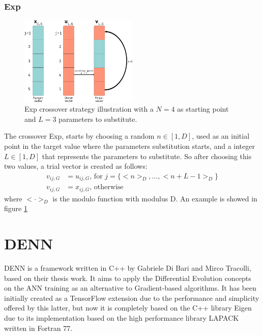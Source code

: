 \subsubsection{Exp}
\begin{figure}[h!]
	\centering
	\includegraphics[width=0.5\textwidth]{figures/de-exp.png}
	\caption{Exp crossover strategy illustration with a $N = 4$ as starting point and $L = 3$ parameters to substitute.}
	\label{fig:exp-crossover}
\end{figure}
The crossover Exp, starts by choosing a random $n \in [1, D]$, used as an initial point in the target value where the parameters substitution starts, and a integer $L \in [1, D]$ that represents the parameters to substitute. So after choosing this two values, a trial vector is created as follows:
\begin{align}
	v_{ij, G} &= u_{ij, G}\textrm{,  for } j = \{<n>_{D}, \dots, <n + L - 1>_{D}\} \\
	v_{ij, G} &= x_{ij, G}\textrm{,  otherwise}
\end{align} 
where $< \cdot >_{D}$ is the modulo function with modulus D. An example is showed in figure \ref{fig:exp-crossover}

\section{DENN}\label{sec:DENN}
DENN is a framework written in C++ by Gabriele Di Bari and Mirco Tracolli, based on their thesis work. It aims to apply the Differential Evolution concepts on the ANN training as an alternative to Gradient-based algorithms. It has been initially created as a TensorFlow extension due to the performance and simplicity offered by this latter, but now it is completely based on the C++ library Eigen due to its implementation based on the high performance library LAPACK written in Fortran 77.

